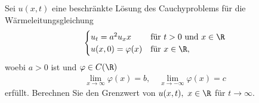 
\begin{exercise}

Sei $u(x,t)$ eine beschränkte Lösung des Cauchyproblems für die Wärmeleitungsgleichung
\begin{align*}
  \begin{cases}
    u_t = a^2u_xx & \text{für } t > 0 \text{ und } x \in \R \\
    u(x,0) = \varphi(x) & \text{für } x \in \R,
  \end{cases}
\end{align*}
woebi $a > 0$ ist und $\varphi \in C(\R)$
\begin{align*}
  \lim_{x \to \infty} \varphi(x) = b, \quad \lim_{x \to -\infty} \varphi(x) = c
\end{align*}
erfüllt. Berechnen Sie den Grenzwert von $u(x,t),\ x \in \R$ für $t \to \infty$.
\end{exercise}


\begin{solution}

\phantom{}

\end{solution}

